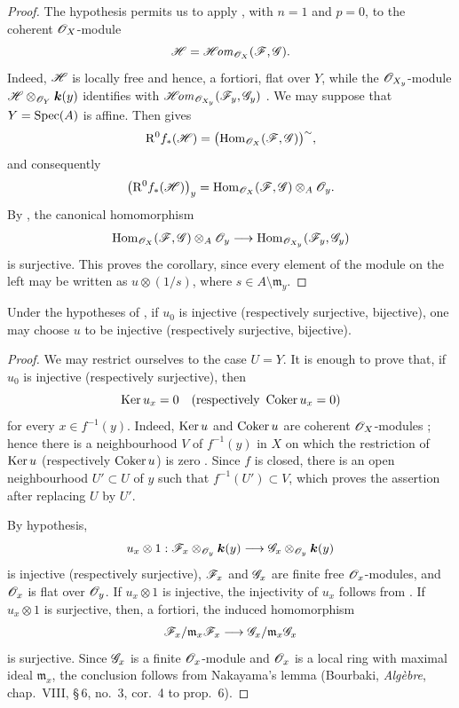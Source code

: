 \begin{proof}
The hypothesis permits us to apply , with $n=1$
and $p=0$, to the coherent $\mathscr{O}_X$-module
\[
  \mathscr{H}=\mathscr{H}\!\mathit{om}_{\mathscr{O}_X}(\mathscr{F},\mathscr{G}).
\]
Indeed, $\mathscr{H}$ is locally free and hence, a fortiori, flat over
$Y$, while the $\mathscr{O}_{X_y}$-module
$\mathscr{H}\otimes_{\mathscr{O}_Y}\boldsymbol{k}(y)$ identifies with
$\mathscr{H}\!\mathit{om}_{\mathscr{O}_{X_y}}(\mathscr{F}_y,\mathscr{G}_y)$
.  We may suppose that $Y=\operatorname{Spec}(A)$ is affine.
Then  gives
\[
  \mathrm{R}^0f_*(\mathscr{H})
  =
  \bigl(\operatorname{Hom}_{\mathscr{O}_X}(\mathscr{F},\mathscr{G})\bigr)^{\sim},
\]
and consequently
\[
  \bigl(\mathrm{R}^0f_*(\mathscr{H})\bigr)_y
  =
  \operatorname{Hom}_{\mathscr{O}_X}(\mathscr{F},\mathscr{G})
    \otimes_A\mathscr{O}_y.
\]
By , the canonical homomorphism
\[
  \operatorname{Hom}_{\mathscr{O}_X}(\mathscr{F},\mathscr{G})
    \otimes_A\mathscr{O}_y
  \longrightarrow
  \operatorname{Hom}_{\mathscr{O}_{X_y}}(\mathscr{F}_y,\mathscr{G}_y)
\]
is surjective.  This proves the corollary, since every element of
the module on the left may be written as $u\otimes(1/s)$, where
$s\in A\setminus\mathfrak m_y$.
\end{proof}

\begin{corollary}[4.6.3]
\label{III.4.6.3}
Under the hypotheses of , if $u_0$ is injective
(respectively surjective, bijective), one may choose $u$ to be
injective (respectively surjective, bijective).
\end{corollary}

\begin{proof}
We may restrict ourselves to the case $U=Y$.  It is enough to prove
that, if $u_0$ is injective (respectively surjective), then
\[
  \operatorname{Ker} u_x=0
  \quad\text{(respectively }\operatorname{Coker} u_x=0\text{)}
\]
for every $x\in f^{-1}(y)$.  Indeed, $\operatorname{Ker} u$ and $\operatorname{Coker} u$ are
coherent $\mathscr{O}_X$-modules ; hence there is a
neighbourhood $V$ of $f^{-1}(y)$ in $X$ on which the restriction of
$\operatorname{Ker} u$ (respectively $\operatorname{Coker} u$) is zero .
Since $f$ is closed, there is an open neighbourhood
$U'\subset U$ of $y$ such that $f^{-1}(U')\subset V$, which proves
the assertion after replacing $U$ by $U'$.


By hypothesis,
\[
  u_x\otimes1:
  \mathscr{F}_x\otimes_{\mathscr{O}_y}\boldsymbol{k}(y)
  \longrightarrow
  \mathscr{G}_x\otimes_{\mathscr{O}_y}\boldsymbol{k}(y)
\]
is injective (respectively surjective), $\mathscr{F}_x$ and $\mathscr{G}_x$
are finite free $\mathscr{O}_x$-modules, and $\mathscr{O}_x$ is flat over
$\mathscr{O}_y$.  If $u_x\otimes1$ is injective, the injectivity of $u_x$
follows from .  If $u_x\otimes1$ is surjective,
then, a fortiori, the induced homomorphism
\[
  \mathscr{F}_x/\mathfrak m_x\mathscr{F}_x
  \longrightarrow
  \mathscr{G}_x/\mathfrak m_x\mathscr{G}_x
\]
is surjective.  Since $\mathscr{G}_x$ is a finite $\mathscr{O}_x$-module and
$\mathscr{O}_x$ is a local ring with maximal ideal $\mathfrak m_x$, the
conclusion follows from Nakayama's lemma (Bourbaki,
\emph{Alg\`ebre}, chap.~VIII, \S\,6, no.~3, cor.~4 to prop.~6).
\end{proof}

